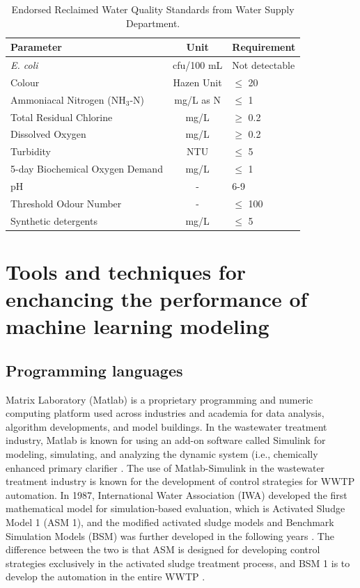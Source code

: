 \begin{table}[!ht]
    \centering
    \caption{\label{tab:reclaimed-standard}Endorsed Reclaimed Water Quality Standards from Water Supply Department.}
    \begin{NiceTabular}{lcl}
        \toprule
        Parameter & Unit & Requirement  \\
        \midrule
        \textit{E. coli} & cfu/100 mL & Not detectable \\ 
        Colour & Hazen Unit & $\le$ 20 \\ 
        Ammoniacal Nitrogen (NH$_3$-N) & mg/L as N & $\le$ 1 \\ 
        Total Residual Chlorine & mg/L & $\ge$ 0.2 \\ 
        Dissolved Oxygen & mg/L & $\ge$ 0.2 \\ 
        Turbidity & NTU & $\le$ 5 \\ 
        5-day Biochemical Oxygen Demand & mg/L & $\le$ 1 \\ 
        pH & - & 6-9 \\ 
        Threshold Odour Number & - & $\le$ 100 \\ 
        Synthetic detergents & mg/L & $\le$ 5 \\
        \bottomrule
    \end{NiceTabular}
\end{table}

\section{Tools and techniques for enchancing the performance of machine learning modeling}
\subsection{Programming languages}

Matrix Laboratory (Matlab) is a proprietary programming and numeric computing platform used across industries and academia for data analysis, algorithm developments, and model buildings. In the wastewater treatment industry, Matlab is known for using an add-on software called Simulink for modeling, simulating, and analyzing the dynamic system (i.e., chemically enhanced primary clarifier \citep{bachisModellingCharacterizationPrimary2015}. The use of Matlab-Simulink in the wastewater treatment industry is known for the development of control strategies for WWTP automation. In 1987, International Water Association (IWA) developed the first mathematical model for simulation-based evaluation, which is Activated Sludge Model 1 (ASM 1), and the modified activated sludge models and Benchmark Simulation Models (BSM) was further developed in the following years \citep{talibModelingControlWastewater2011}. The difference between the two is that ASM is designed for developing control strategies exclusively in the activated sludge treatment process, and BSM 1 is to develop the automation in the entire WWTP \citep{ballhysaWastewaterTreatmentPlant2020}.

